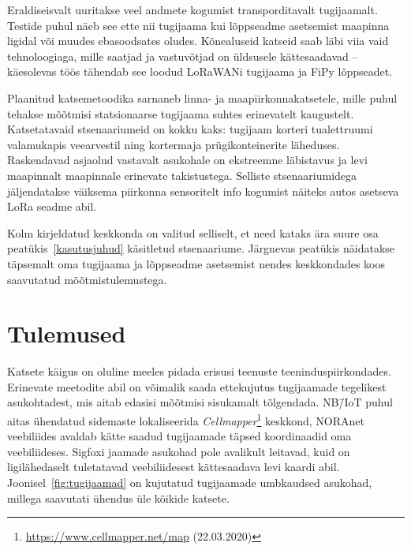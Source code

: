 \documentclass[12pt]{article}
\begin{document}
    Eraldiseisvalt uuritakse veel andmete kogumist transporditavalt tugijaamalt.
    Testide puhul näeb see ette nii tugijaama kui lõppseadme asetsemist maapinna ligidal või muudes ebasoodsates oludes.
    Kõnealuseid katseid saab läbi viia vaid tehnoloogiaga, mille saatjad ja vastuvõtjad on üldsusele kättesaadavad -- käesolevas töös tähendab see loodud LoRaWANi tugijaama ja FiPy lõppseadet.

    Plaanitud katsemetoodika sarnaneb linna- ja maapiirkonnakatsetele, mille puhul tehakse mõõtmisi statsionaarse tugijaama suhtes erinevatelt kaugustelt.
    Katsetatavaid stsenaariumeid on kokku kaks: tugijaam korteri tualettruumi valamukapis veearvestil ning kortermaja prügikonteinerite läheduses.
    Raskendavad asjaolud vastavalt asukohale on ekstreemne läbistavus ja levi maapinnalt maapinnale erinevate takistustega.
    Selliste stsenaariumidega jäljendatakse väiksema piirkonna sensoritelt info kogumist näiteks autos asetseva LoRa seadme abil.

    Kolm kirjeldatud keskkonda on valitud selliselt, et need kataks ära suure osa peatükis~\ref{kasutusjuhud} käsitletud stsenaariume.
    Järgnevas peatükis näidatakse täpsemalt oma tugijaama ja lõppseadme asetsemist nendes keskkondades koos saavutatud mõõtmistulemustega.

    \newpage

    \section{Tulemused}

    Katsete käigus on oluline meeles pidada erisusi teenuste teeninduspiirkondades.
    Erinevate meetodite abil on võimalik saada ettekujutus tugijaamade tegelikest asukohtadest, mis aitab edasisi mõõtmisi sisukamalt tõlgendada.
    NB\=/IoT puhul aitas ühendatud sidemaste lokaliseerida \textit{Cellmapper}\footnote{\url{https://www.cellmapper.net/map} (22.03.2020)} keskkond, NORAnet veebiliides avaldab kätte saadud tugijaamade täpsed koordinaadid oma veebiliideses.
    Sigfoxi jaamade asukohad pole avalikult leitavad, kuid on ligilähedaselt tuletatavad veebiliidesest kättesaadava levi kaardi abil.
    Joonisel~\ref{fig:tugijaamad} on kujutatud tugijaamade umbkaudsed asukohad, millega saavutati ühendus üle kõikide katsete.
\end{document}
